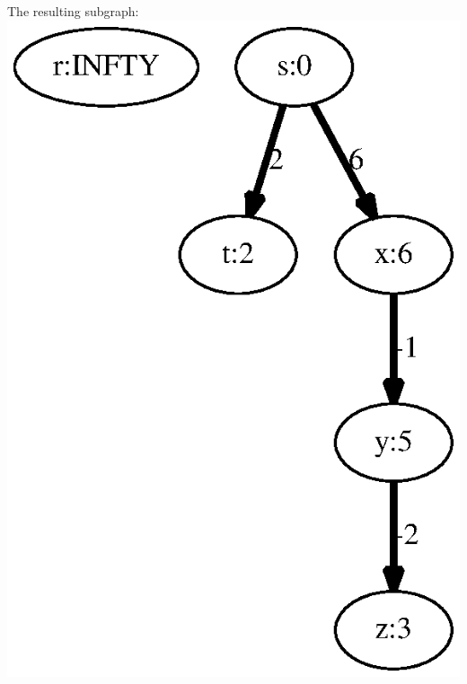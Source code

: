 \documentclass{article}
\begin{document}
\begin{minipage}{0.18181818181818182\linewidth}
The resulting subgraph: 
\includegraphics[width=\linewidth]{dag_shortest_path_07.eps}
\end{minipage}
\end{document}
